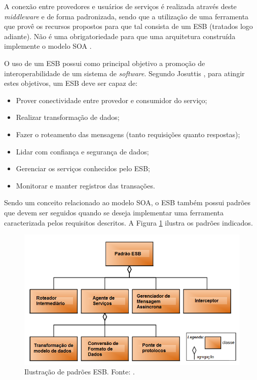 A conexão entre provedores e usuários de serviços é realizada através deste \textit{middleware} e de forma padronizada, sendo que a utilização de uma ferramenta que provê os recursos propostos para que tal consista de um ESB (tratados logo adiante). Não é uma obrigatoriedade para que uma arquitetura construída implemente o modelo SOA \cite{lewis_getting_2010}.

O uso de um ESB possui como principal objetivo a promoção de interoperabilidade de um sistema de \textit{software}. Segundo Josuttis \cite{josuttis_soa_2007}, para atingir estes objetivos, um ESB deve ser capaz de:

\begin{itemize}
\item Prover conectividade entre provedor e consumidor do serviço;
\item Realizar transformação de dados;
\item Fazer o roteamento das mensagens (tanto requisições quanto respostas);
\item Lidar com confiança e segurança de dados;
\item Gerenciar os serviços conhecidos pelo ESB;
\item Monitorar e manter registros das transações.
\end{itemize}

Sendo um conceito relacionado ao modelo SOA, o ESB também possui padrões que devem ser seguidos quando se deseja implementar uma ferramenta caracterizada pelos requisitos descritos. A Figura \ref{padrao_ESB} ilustra os padrões indicados.

\begin{figure}[htb]
\centering
\includegraphics[scale=0.5]{figuras/padrao_ESB.png}
\caption{Ilustração de padrões ESB. Fonte: \cite{bianco_architecting_2011}.}
\label{padrao_ESB}
\end{figure}

